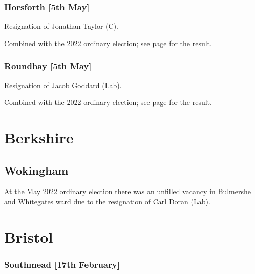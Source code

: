 \documentclass[a4paper,openany]{book}
\begin{document}
\begin{resultsiii}
\subsubsection*{Horsforth \hspace*{\fill}\nolinebreak[1]%
	\enspace\hspace*{\fill}
	[5th May]}


Resignation of Jonathan Taylor (C).

Combined with the 2022 ordinary election; see page \pageref{LeedsHorsforth} for the result.

\subsubsection*{Roundhay \hspace*{\fill}\nolinebreak[1]%
	\enspace\hspace*{\fill}
	[5th May]}


Resignation of Jacob Goddard (Lab).

Combined with the 2022 ordinary election; see page \pageref{LeedsRoundhay} for the result.

\section{Berkshire}

\subsection*{Wokingham}

At the May 2022 ordinary election there was an unfilled vacancy in Bulmershe and Whitegates ward due to the resignation of Carl Doran (Lab).%

\section{Bristol}

\subsubsection*{Southmead \hspace*{\fill}\nolinebreak[1]%
	\enspace\hspace*{\fill}
	[17th February]}


\end{resultsiii}
\end{document}
